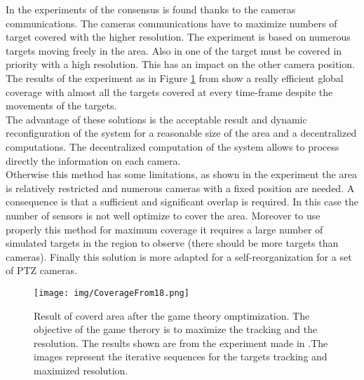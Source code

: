   In the experiments of \cite{18*ding2012,25*song2008} the consensus is found thanks to the cameras communications. The cameras communications have to maximize numbers of target covered with the higher resolution.
 The experiment is based on numerous targets moving freely in the area. Also in \cite{18*ding2012} one of the target must be covered in priority with a high resolution. This has an impact on the other camera position.
 The results of the experiment as in Figure \ref{fig:CoverageFrom18} from \cite{18*ding2012} show a really efficient global coverage with almost all the targets covered at every time-frame despite the movements of the targets. \\
 The advantage of these solutions is the acceptable result and dynamic reconfiguration of the system for a reasonable size of the area and a decentralized computations. The decentralized computation of the system allows to process directly the information on each camera.\\ 
Otherwise this method has some limitations, as shown in the experiment the area is relatively restricted and numerous cameras with a fixed position are needed. A consequence is that a sufficient and significant overlap is required. 
 In this case the number of sensors is not well optimize to cover the area. Moreover to use properly this method for maximum coverage it requires a large number of simulated targets in the region to observe (there should be more targets than cameras).  Finally this solution is more adapted for a self-reorganization for a set of PTZ cameras.

\begin{figure}[t!]
\center
{}
   \texttt{[image: img/CoverageFrom18.png]}
  \caption{Result of coverd area after the game theory omptimization. The objective of the game therory is to maximize the tracking and the resolution. The results shown are from the experiment made in \cite{18*ding2012}.The images  represent the iterative sequences for the targets tracking and maximized resolution.}\label{fig:CoverageFrom18}\endminipage\hfill
\end{figure}
	
